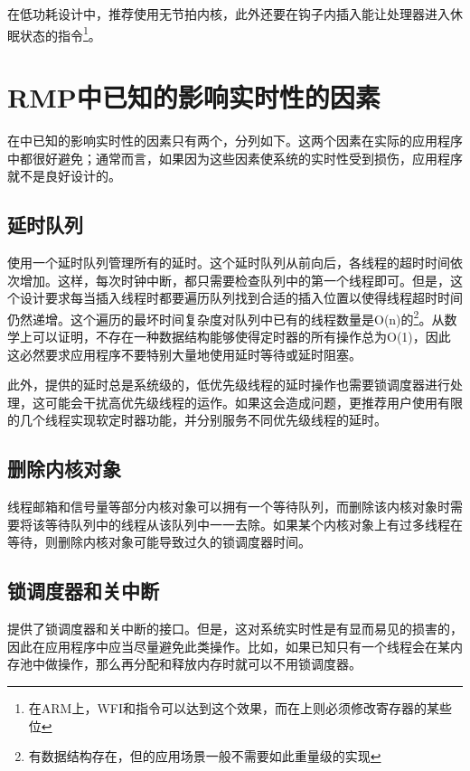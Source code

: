 在低功耗设计中，推荐使用无节拍内核，此外还要在钩子内插入能让处理器进入休眠状态的指令\footnote{在ARM上，WFI和指令可以达到这个效果，而在上则必须修改寄存器的某些位}。

\section{RMP中已知的影响实时性的因素}\label{sec:known-factors-that-affect-real-time-performance-in-rmp}

在中已知的影响实时性的因素只有两个，分列如下。这两个因素在实际的应用程序中都很好避免；通常而言，如果因为这些因素使系统的实时性受到损伤，应用程序就不是良好设计的。

\subsection{延时队列}\label{subsec:the-delay-queue}

使用一个延时队列管理所有的延时。这个延时队列从前向后，各线程的超时时间依次增加。这样，每次时钟中断，都只需要检查队列中的第一个线程即可。但是，这个设计要求每当插入线程时都要遍历队列找到合适的插入位置以使得线程超时时间仍然递增。这个遍历的最坏时间复杂度对队列中已有的线程数量是O(n)的\footnote{有数据结构存在，但的应用场景一般不需要如此重量级的实现}。从数学上可以证明，不存在一种数据结构能够使得定时器的所有操作总为O(1)，因此这必然要求应用程序不要特别大量地使用延时等待或延时阻塞。

此外，提供的延时总是系统级的，低优先级线程的延时操作也需要锁调度器进行处理，这可能会干扰高优先级线程的运作。如果这会造成问题，更推荐用户使用有限的几个线程实现软定时器功能，并分别服务不同优先级线程的延时。

\subsection{删除内核对象}\label{subsec:deleting-kernel-objects}

线程邮箱和信号量等部分内核对象可以拥有一个等待队列，而删除该内核对象时需要将该等待队列中的线程从该队列中一一去除。如果某个内核对象上有过多线程在等待，则删除内核对象可能导致过久的锁调度器时间。

\subsection{锁调度器和关中断}\label{subsec:locking-the-scheduler-and-disabling-interrupts}

提供了锁调度器和关中断的接口。但是，这对系统实时性是有显而易见的损害的，因此在应用程序中应当尽量避免此类操作。比如，如果已知只有一个线程会在某内存池中做操作，那么再分配和释放内存时就可以不用锁调度器。

